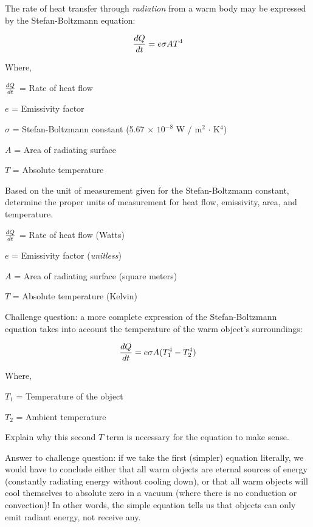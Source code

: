 

The rate of heat transfer through {\it radiation} from a warm body may be expressed by the Stefan-Boltzmann equation:

$${dQ \over dt} = e \sigma A T^4$$

\noindent
Where,

$dQ \over dt$ = Rate of heat flow 

$e$ = Emissivity factor 

$\sigma$ = Stefan-Boltzmann constant (5.67 $\times$ $10^{-8}$ W / m$^{2}$ $\cdot$ K$^{4}$)

$A$ = Area of radiating surface

$T$ = Absolute temperature 

\vskip 10pt

Based on the unit of measurement given for the Stefan-Boltzmann constant, determine the proper units of measurement for heat flow, emissivity, area, and temperature.







$dQ \over dt$ = Rate of heat flow (Watts)

$e$ = Emissivity factor ({\it unitless})

$A$ = Area of radiating surface (square meters)

$T$ = Absolute temperature (Kelvin)

\vskip 10pt

Challenge question: a more complete expression of the Stefan-Boltzmann equation takes into account the temperature of the warm object's surroundings:

$${dQ \over dt} = e \sigma A (T_1^4 - T_2^4)$$

\noindent
Where,

$T_1$ = Temperature of the object

$T_2$ = Ambient temperature

\vskip 10pt

Explain why this second $T$ term is necessary for the equation to make sense.







Answer to challenge question: if we take the first (simpler) equation literally, we would have to conclude either that all warm objects are eternal sources of energy (constantly radiating energy without cooling down), or that all warm objects will cool themselves to absolute zero in a vacuum (where there is no conduction or convection)!  In other words, the simple equation tells us that objects can only emit radiant energy, not receive any.




